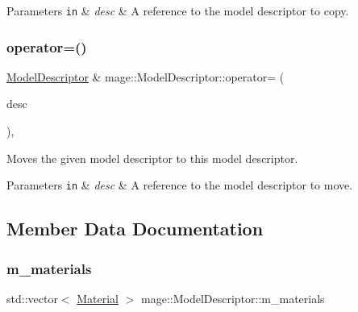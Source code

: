 \begin{DoxyParams}[1]{Parameters}
\mbox{\tt in}  & {\em desc} & A reference to the model descriptor to copy. \\
\hline
\end{DoxyParams}
\hypertarget{classmage_1_1_model_descriptor_aea3caadade51ff234b9a6e2e89f47321}{}\label{classmage_1_1_model_descriptor_aea3caadade51ff234b9a6e2e89f47321} 
\subsubsection{\texorpdfstring{operator=()}{operator=()}\hspace{0.1cm}{\footnotesize\ttfamily [2/2]}}
{\footnotesize\ttfamily \hyperlink{classmage_1_1_model_descriptor}{Model\+Descriptor} \& mage\+::\+Model\+Descriptor\+::operator= (\begin{DoxyParamCaption}\item[{\hyperlink{classmage_1_1_model_descriptor}{Model\+Descriptor} \&\&}]{desc }\end{DoxyParamCaption})\hspace{0.3cm}{\ttfamily [default]}, {\ttfamily [noexcept]}}

Moves the given model descriptor to this model descriptor.


\begin{DoxyParams}[1]{Parameters}
\mbox{\tt in}  & {\em desc} & A reference to the model descriptor to move. \\
\hline
\end{DoxyParams}


\subsection{Member Data Documentation}
\hypertarget{classmage_1_1_model_descriptor_a4932961cdc073375135a33bf85e2ccf2}{}\label{classmage_1_1_model_descriptor_a4932961cdc073375135a33bf85e2ccf2} 
\subsubsection{\texorpdfstring{m\+\_\+materials}{m\_materials}}
{\footnotesize\ttfamily std\+::vector$<$ \hyperlink{classmage_1_1_material}{Material} $>$ mage\+::\+Model\+Descriptor\+::m\+\_\+materials\hspace{0.3cm}{\ttfamily [private]}}

